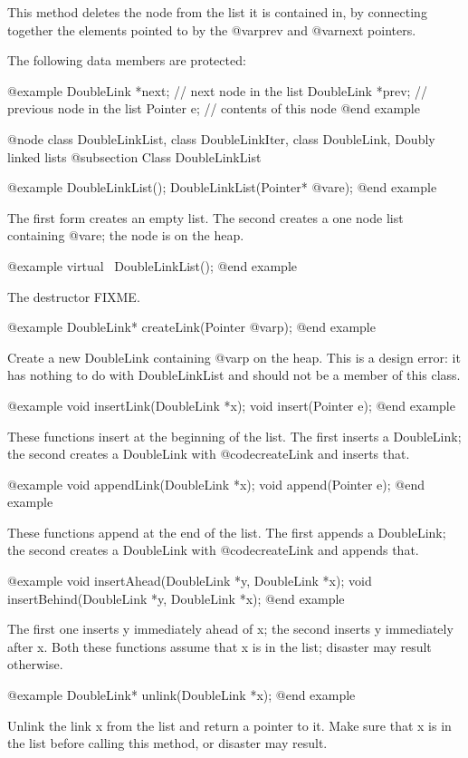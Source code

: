 This method deletes the node from the list it is contained in, by
connecting together the elements pointed to by the @var{prev} and
@var{next} pointers.

The following data members are protected:

@example
DoubleLink *next; // next node in the list
DoubleLink *prev; // previous node in the list
Pointer e;        // contents of this node
@end example

@node class DoubleLinkList, class DoubleLinkIter, class DoubleLink, Doubly linked lists
@subsection Class DoubleLinkList

@example
DoubleLinkList();
DoubleLinkList(Pointer* @var{e});
@end example

The first form creates an empty list.  The second creates a one
node list containing @var{e}; the node is on the heap.

@example
virtual ~DoubleLinkList();
@end example

The destructor FIXME.

@example
DoubleLink* createLink(Pointer @var{p});
@end example

Create a new DoubleLink containing @var{p} on the heap.
This is a design error: it has nothing to do with DoubleLinkList
and should not be a member of this class.

@example
void insertLink(DoubleLink *x);
void insert(Pointer e);
@end example

These functions insert at the beginning of the list.  The first inserts
a DoubleLink; the second creates a DoubleLink with @code{createLink}
and inserts that.

@example
void appendLink(DoubleLink *x);
void append(Pointer e);
@end example

These functions append at the end of the list.  The first appends
a DoubleLink; the second creates a DoubleLink with @code{createLink}
and appends that.

@example
void insertAhead(DoubleLink *y, DoubleLink *x);
void insertBehind(DoubleLink *y, DoubleLink *x);
@end example

The first one inserts y immediately ahead of x; the second
inserts y immediately after x.  Both these functions assume
that x is in the list; disaster may result otherwise.

@example
DoubleLink* unlink(DoubleLink *x);
@end example

Unlink the link x from the list and return a pointer to it.
Make sure that x is in the list before calling this method,
or disaster may result.

